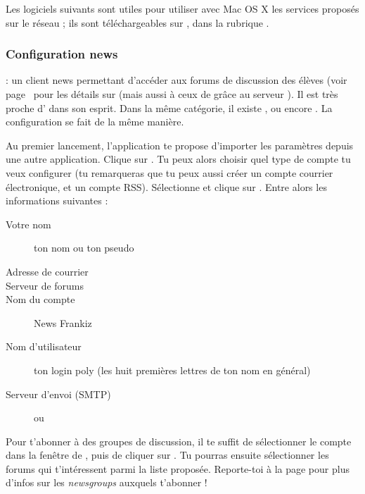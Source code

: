 

Les logiciels suivants sont utiles pour utiliser avec Mac OS X les services proposés sur le réseau ; ils sont téléchargeables sur , dans la rubrique .


\subsubsection{Configuration news}

  : un client news permettant d'accéder aux forums de discussion des élèves (voir page~\pageref{newsgroups} pour les détails sur  (mais aussi à ceux de  grâce au serveur ). Il est très proche d' dans son esprit. Dans la même catégorie, il existe ,  ou encore . La configuration se fait de la même manière.

Au premier lancement, l'application te propose d'importer les paramètres depuis une autre application. Clique sur . Tu peux alors choisir quel type de compte tu veux configurer (tu remarqueras que tu peux aussi créer un compte courrier électronique, et un compte RSS). Sélectionne  et clique sur . Entre alors les informations suivantes :

\begin{description}
  \item[Votre nom] ton nom ou ton pseudo
  \item[Adresse de courrier] 
  \item[Serveur de forums] 
  \item[Nom du compte] News Frankiz
  \item[Nom d'utilisateur] ton login poly (les huit premières lettres de ton nom en général)
  \item[Serveur d'envoi (SMTP)]  ou 
\end{description}


Pour t'abonner à des groupes de discussion, il te suffit de sélectionner le compte  dans la fenêtre  de , puis de cliquer sur . Tu pourras ensuite sélectionner les forums qui t'intéressent parmi la liste proposée. Reporte-toi à la page \pageref{newsgroups} pour plus d'infos sur les \emph{newsgroups} auxquels t'abonner !


